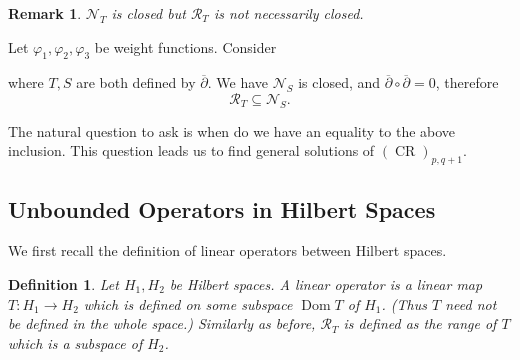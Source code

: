\documentclass{article}
\newtheorem{definition}{Definition}[section]
\newtheorem{remark}{Remark}[section]
\DeclareMathOperator{\CR}{CR}
\DeclareMathOperator{\Dom}{Dom}
\newcommand{\G}[0]{\mathcal{G}}
\begin{document}
  \begin{remark}
    $\mathcal{N}_T$ is closed but $\mathcal{R}_T$ is not necessarily closed.
  \end{remark}


  Let $\varphi_1,\varphi_2,\varphi_3$ be weight functions. Consider
  \begin{center}
  \end{center}
  where $T,S$ are both defined by $\overline{\partial}$.
  We have $\mathcal{N}_S$ is closed, and $\overline{\partial}\circ\overline{\partial}=0$, therefore 
  \begin{equation*}
    \mathcal{R}_T\subseteq\mathcal{N}_S.
  \end{equation*}

The natural question to ask is when do we have an equality to the above inclusion. This question leads us to find general solutions of $(\CR)_{p,q+1}$.
\subsection{Unbounded Operators in Hilbert Spaces}
We first recall the definition of linear operators between Hilbert spaces.
\begin{definition}
  Let $H_1,H_2$ be Hilbert spaces. A linear operator is a linear map $T:H_1\to H_2$ which is defined on some subspace $\Dom T$ of $H_1$. (Thus $T$ need not be defined in the whole space.) Similarly as before, $\mathcal{R}_T$ is defined as the range of $T$ which is a subspace of $H_2$. 
\end{definition}
\end{document}
